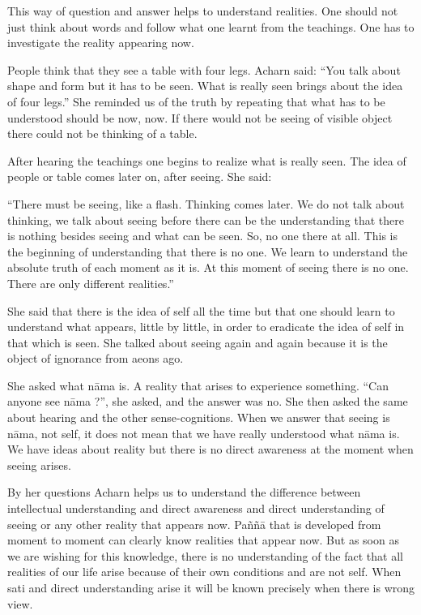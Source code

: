 This way of question and answer helps to understand realities. One
should not just think about words and follow what one learnt from the
teachings. One has to investigate the reality appearing now.

People think that they see a table with four legs. Acharn said: ``You
talk about shape and form but it has to be seen. What is really seen
brings about the idea of four legs.'' She reminded us of the truth by
repeating that what has to be understood should be now, now. If there
would not be seeing of visible object there could not be thinking of a
table.

After hearing the teachings one begins to realize what is really seen.
The idea of people or table comes later on, after seeing. She said:

``There must be seeing, like a flash. Thinking comes later. We do not
talk about thinking, we talk about seeing before there can be the
understanding that there is nothing besides seeing and what can be seen.
So, no one there at all. This is the beginning of understanding that
there is no one. We learn to understand the absolute truth of each
moment as it is. At this moment of seeing there is no one. There are
only different realities.''

She said that there is the idea of self all the time but that one should
learn to understand what appears, little by little, in order to
eradicate the idea of self in that which is seen. She talked about
seeing again and again because it is the object of ignorance from aeons
ago.

She asked what nāma is. A reality that arises to experience something.
``Can anyone see nāma ?'', she asked, and the answer was no. She then
asked the same about hearing and the other sense-cognitions. When we
answer that seeing is nāma, not self, it does not mean that we have
really understood what nāma is. We have ideas about reality but there is
no direct awareness at the moment when seeing arises.

By her questions Acharn helps us to understand the difference between
intellectual understanding and direct awareness and direct understanding
of seeing or any other reality that appears now. Paññā that is developed
from moment to moment can clearly know realities that appear now. But as
soon as we are wishing for this knowledge, there is no understanding of
the fact that all realities of our life arise because of their own
conditions and are not self. When sati and direct understanding arise it
will be known precisely when there is wrong view.

